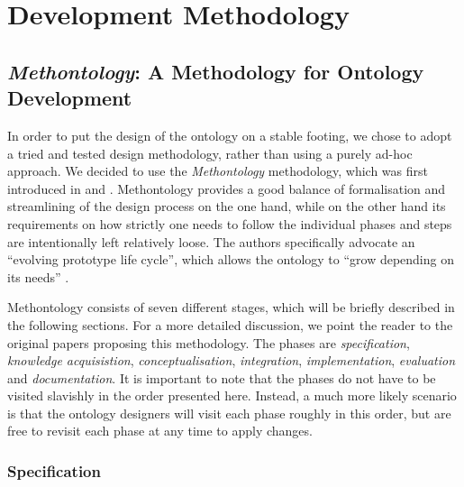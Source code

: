 \documentclass[twoside]{fast_latex}
\begin{document}
\clearpage
{}
\appendix

\section{Development Methodology}

\subsection{\emph{Methontology}: A Methodology for Ontology Development} %
\label{sub:methontology_a_methodology_for_ontology_development}

In order to put the design of the ontology on a stable footing, we chose to adopt a tried and tested design methodology, rather than using a purely ad-hoc approach. We decided to use the \emph{Methontology} methodology, which was first introduced in \cite{gomez_perez1996conceptualise_ontologies} and \cite{fernandez1997methontology}. Methontology provides a good balance of formalisation and streamlining of the design process on the one hand, while on the other hand its requirements on how strictly one needs to follow the individual phases and steps are intentionally left relatively loose.
The authors specifically advocate an ``evolving prototype life cycle'', which allows the ontology to ``grow depending on its needs'' \cite{fernandez1997methontology}.

Methontology consists of seven different stages, which will be briefly described in the following sections. For a more detailed discussion, we point the reader to the original papers proposing this methodology. The phases are \emph{specification}, \emph{knowledge acquisistion}, \emph{conceptualisation}, \emph{integration}, \emph{implementation}, \emph{evaluation} and \emph{documentation}. It is important to note that the phases do not have to be visited slavishly in the order presented here. Instead, a much more likely scenario is that the ontology designers will visit each phase roughly in this order, but are free to revisit each phase at any time to apply changes.

\subsubsection{Specification} %
\label{ssub:specification}
\end{document}
